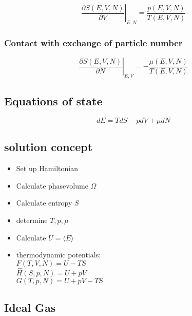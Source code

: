 \begin{equation*}
    \left. \frac{\partial S(E,V,N)}{\partial V} \right|_{E,N} = \frac{p(E,V,N)}{T(E,V,N)}
\end{equation*}

\subsubsection*{Contact with exchange of particle number}

\begin{equation*}
    \left. \frac{\partial S(E,V,N)}{\partial N} \right|_{E,V} = - \frac{\mu (E,V,N)}{T(E,V,N)}
\end{equation*}

\subsection*{Equations of state}

\begin{equation*}
    dE = TdS - pdV + \mu dN
\end{equation*}

\subsection*{solution concept}

\begin{itemize}
    \itemsep 0pt
    \item Set up Hamiltonian
    \item Calculate phasevolume $\Omega$
    \item Calculate entropy $S$
    \item determine $T,p,\mu$
    \item Calculate $U = \langle E \rangle$
    \item thermodynamic potentials: \\
            $F(T,V,N) = U-TS$ \\
            $\hat{H}(S,p,N) = U + pV$ \\
            $G(T,p,N) = U + pV -TS$
\end{itemize}


\subsection*{Ideal Gas}

